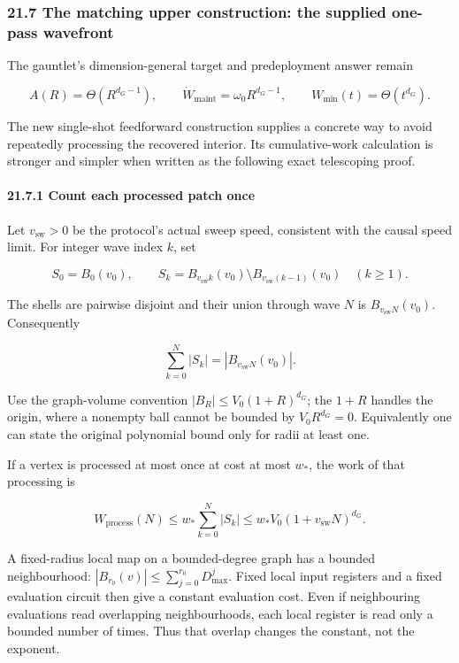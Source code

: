 \documentclass[
]{article}
\newcounter{none} %
\begin{document}
\subsubsection{21.7 The matching upper construction: the supplied
one-pass
wavefront}\label{the-matching-upper-construction-the-supplied-one-pass-wavefront}

The gauntlet's dimension-general target and predeployment answer remain

\[
A(R)=\Theta(R^{d_G-1}),\qquad
\dot W_{\mathrm{maint}}=\omega_0R^{d_G-1},\qquad
W_{\min}(t)=\Theta(t^{d_G}).
\]

The new single-shot feedforward construction supplies a concrete way to
avoid repeatedly processing the recovered interior. Its cumulative-work
calculation is stronger and simpler when written as the following exact
telescoping proof.

\paragraph{21.7.1 Count each processed patch
once}\label{count-each-processed-patch-once}

Let \(v_{\mathrm{sw}}>0\) be the protocol's actual sweep speed,
consistent with the causal speed limit. For integer wave index \(k\),
set

\[
S_0=B_0(v_0),\qquad
S_k=B_{v_{\mathrm{sw}}k}(v_0)\setminus
B_{v_{\mathrm{sw}}(k-1)}(v_0)\quad(k\ge1).
\]

The shells are pairwise disjoint and their union through wave \(N\) is
\(B_{v_{\mathrm{sw}}N}(v_0)\). Consequently

\[
\boxed{\sum_{k=0}^N|S_k|=|B_{v_{\mathrm{sw}}N}(v_0)|}.
\]

Use the graph-volume convention \(|B_R|\le V_0(1+R)^{d_G}\); the \(1+R\)
handles the origin, where a nonempty ball cannot be bounded by
\(V_0R^{d_G}=0\). Equivalently one can state the original polynomial
bound only for radii at least one.

If a vertex is processed at most once at cost at most \(w_*\), the work
of that processing is

\[
W_{\mathrm{process}}(N)
\le w_*\sum_{k=0}^N|S_k|
\le w_*V_0(1+v_{\mathrm{sw}}N)^{d_G}.
\]

A fixed-radius local map on a bounded-degree graph has a bounded
neighbourhood: \(|B_{r_0}(v)|\le\sum_{j=0}^{r_0}D_{\max}^j\). Fixed
local input registers and a fixed evaluation circuit then give a
constant evaluation cost. Even if neighbouring evaluations read
overlapping neighbourhoods, each local register is read only a bounded
number of times. Thus that overlap changes the constant, not the
exponent.
\end{document}
